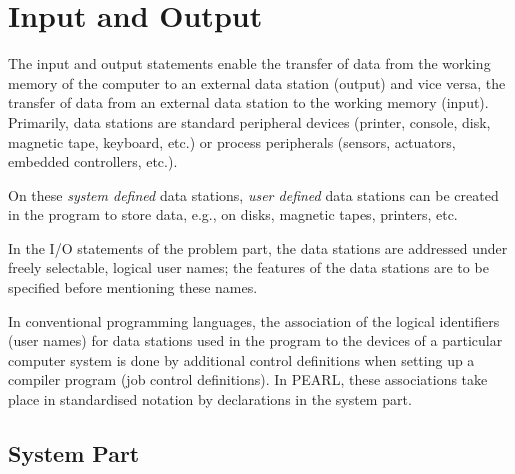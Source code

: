 
\chapter{Input and Output}   %

The input and output statements enable the transfer of data from the
working memory of the computer to an external data station (output) and
vice versa, the transfer of data from an external data station to the
working memory (input). Primarily, data stations are standard peripheral
devices (printer, console, disk, magnetic tape, keyboard, etc.) or
process peripherals (sensors, actuators, embedded controllers, etc.).

On these {\em system defined} data stations, {\em user defined} data
stations can be created in the program to store data, e.g., on disks,
magnetic tapes, printers, etc.

In the I/O statements of the problem part, the data stations are
addressed under freely selectable, logical user names; the features of
the data stations are to be specified before mentioning these names.

In conventional programming languages, the association of the logical
identifiers (user names) for data stations used in the program to the
devices of a particular computer system is done by additional control
definitions when setting up a compiler program (job control
definitions). In PEARL, these associations take place in standardised
notation by declarations in the system part.

\section{System Part}    %
\label{dation_system_part}

